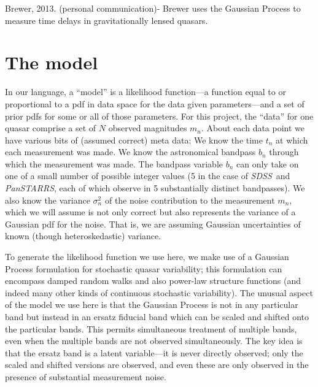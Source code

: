 \documentclass[letterpaper,12pt,preprint]{aastex}
\newcommand{\project}[1]{\textsl{#1}}
\newcommand{\sdss}{\project{SDSS}}
\newcommand{\panstarrs}{\project{PanSTARRS}}
\begin{document}
Brewer, 2013. (personal communication)- Brewer uses the Gaussian Process to measure time delays in gravitationally lensed quasars.

\section{The model}

In our language, a ``model'' is a likelihood function---a function
equal to or proportional to a pdf in data space for the data given
parameters---and a set of prior pdfs for some or all of those
parameters.  For this project, the ``data'' for one quasar comprise a
set of $N$ observed magnitudes $m_n$.  About each data point we have
various bits of (assumed correct) meta data: We know the time $t_n$ at
which each measurement was made.  We know the astronomical bandpass
$b_n$ through which the measurement was made.  The bandpass variable
$b_n$ can only take on one of a small number of possible integer
values (5 in the case of \sdss\ and \panstarrs, each of which observe
in 5 substantially distinct bandpasses).  We also know the variance
$\sigma_n^2$ of the noise contribution to the measurement $m_n$, which
we will assume is not only correct but also represents the variance of
a Gaussian pdf for the noise.  That is, we are assuming Gaussian
uncertainties of known (though heteroskedastic) variance.

To generate the likelihood function we use here, we make
use of a Gaussian Process formulation for stochastic quasar
variability; this formulation can encompass damped random walks
and also power-law structure functions (and indeed many other kinds of
continuous stochastic variability).  The unusual aspect of the model
we use here is that the Gaussian Process is not in any particular band
but instead in an ersatz fiducial band which can be scaled and shifted
onto the particular bands.  This permits simultaneous treatment of
multiple bands, even when the multiple bands are not observed
simultaneously.  The key idea is that the ersatz band is a latent
variable---it is never directly observed; only the scaled and shifted
versions are observed, and even these are only observed in the
presence of substantial measurement noise.
\end{document}
